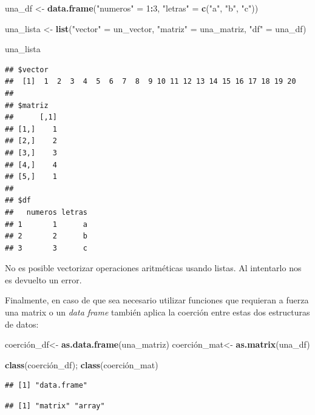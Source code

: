 \documentclass[
]{book}
\newenvironment{Shaded}{\begin{snugshade}}{\end{snugshade}}
\newcommand{\DecValTok}[1]{\textcolor[rgb]{0.00,0.00,0.81}{#1}}
\newcommand{\FunctionTok}[1]{\textcolor[rgb]{0.13,0.29,0.53}{\textbf{#1}}}
\newcommand{\NormalTok}[1]{#1}
\newcommand{\OtherTok}[1]{\textcolor[rgb]{0.56,0.35,0.01}{#1}}
\newcommand{\SpecialCharTok}[1]{\textcolor[rgb]{0.81,0.36,0.00}{\textbf{#1}}}
\newcommand{\StringTok}[1]{\textcolor[rgb]{0.31,0.60,0.02}{#1}}
\begin{document}
\begin{Shaded}
\begin{Highlighting}[]
\NormalTok{una\_df     }\OtherTok{\textless{}{-}} \FunctionTok{data.frame}\NormalTok{(}\StringTok{"numeros"} \OtherTok{=} \DecValTok{1}\SpecialCharTok{:}\DecValTok{3}\NormalTok{, }\StringTok{"letras"} \OtherTok{=} \FunctionTok{c}\NormalTok{(}\StringTok{"a"}\NormalTok{, }\StringTok{"b"}\NormalTok{, }\StringTok{"c"}\NormalTok{))}

\NormalTok{una\_lista }\OtherTok{\textless{}{-}} \FunctionTok{list}\NormalTok{(}\StringTok{"vector"} \OtherTok{=}\NormalTok{ un\_vector, }\StringTok{"matriz"} \OtherTok{=}\NormalTok{ una\_matriz, }\StringTok{"df"} \OtherTok{=}\NormalTok{ una\_df)}

\NormalTok{una\_lista}
\end{Highlighting}
\end{Shaded}

\begin{verbatim}
## $vector
##  [1]  1  2  3  4  5  6  7  8  9 10 11 12 13 14 15 16 17 18 19 20
## 
## $matriz
##      [,1]
## [1,]    1
## [2,]    2
## [3,]    3
## [4,]    4
## [5,]    1
## 
## $df
##   numeros letras
## 1       1      a
## 2       2      b
## 3       3      c
\end{verbatim}

No es posible vectorizar operaciones aritméticas usando listas.
Al intentarlo nos es devuelto un error.

Finalmente, en caso de que sea necesario utilizar funciones que requieran a fuerza una matrix o un \emph{data frame} también aplica la coerción entre estas dos estructuras de datos:

\begin{Shaded}
\begin{Highlighting}[]
\NormalTok{coerción\_df}\OtherTok{\textless{}{-}} \FunctionTok{as.data.frame}\NormalTok{(una\_matriz)}
\NormalTok{coerción\_mat}\OtherTok{\textless{}{-}} \FunctionTok{as.matrix}\NormalTok{(una\_df)}

\FunctionTok{class}\NormalTok{(coerción\_df); }\FunctionTok{class}\NormalTok{(coerción\_mat)}
\end{Highlighting}
\end{Shaded}

\begin{verbatim}
## [1] "data.frame"
\end{verbatim}

\begin{verbatim}
## [1] "matrix" "array"
\end{verbatim}
\end{document}
